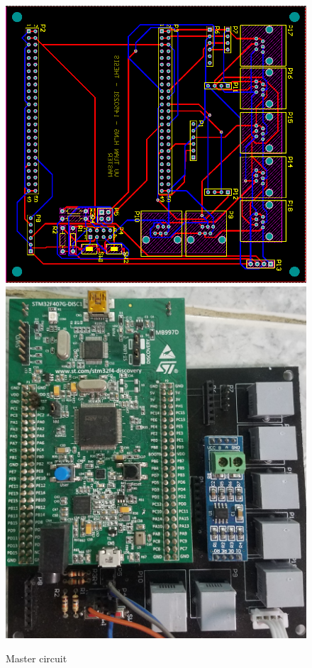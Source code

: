 \begin{figure}[!htp]
    \begin{center}
    \includegraphics[scale=0.5]{images/masterLayout.png}\\

    \includegraphics[scale=0.13]{images/m.jpg}
    \caption{Master circuit}
    \label{fig:masterCircuit}
    \end{center}
\end{figure}
